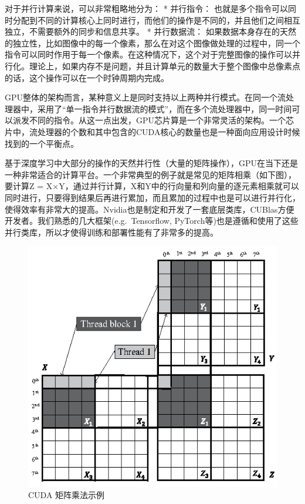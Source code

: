 对于并行计算来说，可以非常粗略地分为： * 并行指令：
也就是多个指令可以同时分配到不同的计算核心上同时进行，而他们的操作是不同的，并且他们之间相互独立，不需要额外的同步和信息共享。
* 并行数据流：
如果数据本身存在的天然的独立性，比如图像中的每一个像素，那么在对这个图像做处理的过程中，同一个指令可以同时作用于每一个像素。在这种情况下，这个对于完整图像的操作可以并行化。理论上，如果内存不是问题，并且计算单元的数量大于整个图像中总像素点的话，这个操作可以在一个时钟周期内完成。

GPU整体的架构而言，某种意义上是同时支持以上两种并行模式。在同一个流处理器中，采用了``单一指令并行数据流的模式''，而在多个流处理器中，同一时间可以派发不同的指令。从这一点出发，GPU芯片算是一个非常灵活的架构。一个芯片中，流处理器的个数和其中包含的CUDA核心的数量也是一种面向应用设计时候找到的一个平衡点。

基于深度学习中大部分的操作的天然并行性（大量的矩阵操作），GPU在当下还是一种非常适合的计算平台。一个非常典型的例子就是常见的矩阵相乘（如下图），要计算Z
=
X×Y，通过并行计算，X和Y中的行向量和列向量的逐元素相乘就可以同时进行，只要得到结果后再进行累加，而且累加的过程中也是可以进行并行化，使得效率有非常大的提高。Nvidia也是制定和开发了一套底层类库，CUBlas方便开发者。我们熟悉的几大框架(e.g.~Tensorflow,
PyTorch等)也是遵循和使用了这些并行类库，所以才使得训练和部署性能有了非常多的提高。

\begin{figure}
\centering
\includegraphics{./img/ch15/mat_mul_gpu.png}
\caption{CUDA 矩阵乘法示例}
\end{figure}

